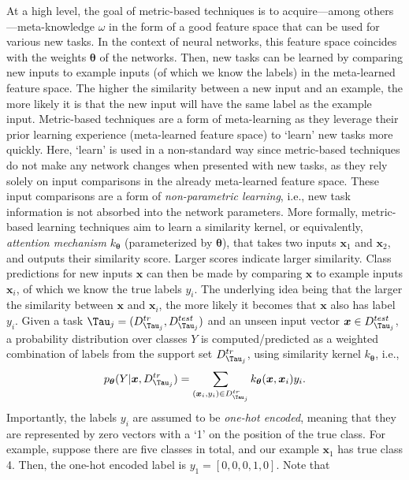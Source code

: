 \label{sec:metriclearning}
At a high level, the goal of metric-based techniques is to acquire---among others---meta-knowledge $\omega$ in the form of a good feature space that can be used for various new tasks. In the context of neural networks, this feature space coincides with the weights $\boldsymbol{\theta}$ of the networks. Then, new tasks can be 
learned by comparing new inputs to example inputs (of which we know the labels) in the meta-learned feature space. The higher the similarity between a new input and an example, the more likely it is that the new input will have the same label as the example input.
Metric-based techniques are a form of meta-learning as they leverage their prior learning experience (meta-learned feature space) to `learn' new tasks more quickly. Here, `learn' is used in a non-standard way since metric-based techniques do not make any network changes when presented with new tasks, as they  rely solely on input comparisons in the already meta-learned feature space. These input comparisons are a form of \textit{non-parametric learning}, i.e., new task information is not absorbed into the network parameters.   
More formally, metric-based learning techniques aim to learn a similarity kernel, or equivalently, \textit{attention mechanism} $k_{\boldsymbol{\theta}}$ (parameterized by $\boldsymbol{\theta}$), that takes two inputs $\boldsymbol{x}_{1}$ and $\boldsymbol{x}_{2}$, and outputs their similarity score. Larger scores indicate larger similarity. Class predictions for new inputs $\boldsymbol{x}$ can then be made by comparing $\boldsymbol{x}$ to example inputs $\boldsymbol{x}_{i}$, of which we know the true labels $y_{i}$. The underlying idea being that the larger the similarity between $\boldsymbol{x}$ and $\boldsymbol{x}_{i}$, the more likely it becomes that $\boldsymbol{x}$ also has label $y_{i}$. 
Given a task $\Tau_{j} = (D^{tr}_{\Tau_{j}}, D^{test}_{\Tau_{j}})$ and an unseen input vector $\boldsymbol{x} \in D^{test}_{\Tau_{j}}$, a probability distribution over classes $Y$ is computed/predicted as a weighted combination of labels from the support set $D^{tr}_{\Tau_{j}}$, using similarity kernel $k_{\boldsymbol{\theta}}$, i.e.,
\begin{align}
    p_{\boldsymbol{\theta}}(Y|\boldsymbol{x}, D^{tr}_{\Tau_{j}}) = \sum_{(\boldsymbol{x}_{i}, y_{i}) \in D^{tr}_{\Tau_{j}}} k_{\boldsymbol{\theta}}(\boldsymbol{x}, \boldsymbol{x}_{i})y_{i}.\label{eq:metricLearning}
\end{align}
Importantly, the labels $y_{i}$ are assumed to be \textit{one-hot encoded}, meaning that they are represented by zero vectors with a `1' on the position of the true class. For example, suppose there are five classes in total, and our example $\boldsymbol{x}_{1}$ has true class 4. Then, the one-hot encoded label is $y_{1} = [0,0,0,1,0]$. Note that
